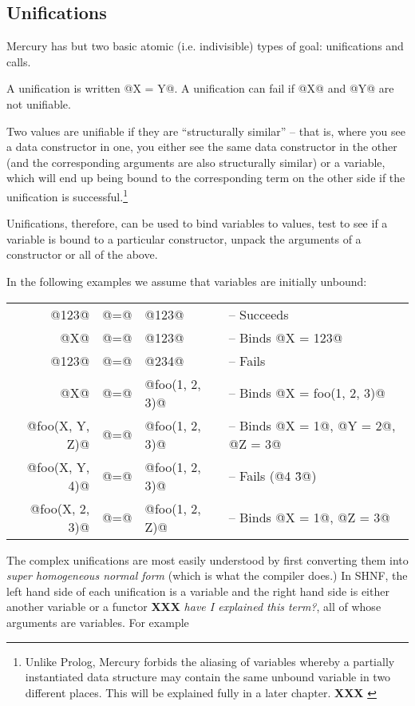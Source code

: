 \documentclass[a4paper,11pt,notitlepage,onecolumn]{article}
\newcommand{\XXX}[1]%
{{\small\textbf{XXX} \emph{#1}}}
\begin{document}
\subsection{Unifications}

Mercury has but two basic atomic (i.e. indivisible) types of
goal: unifications and calls.

A unification is written @X = Y@.  A unification can fail if @X@
and @Y@ are not unifiable.

Two values are unifiable if they are ``structurally similar'' --
that is, where you see a data constructor in one, you either
see the same data constructor in the other (and the
corresponding arguments are also structurally similar) or a
variable, which will end up being bound to the corresponding
term on the other side if the unification is successful.\footnote{Unlike Prolog, Mercury forbids the aliasing of
variables whereby a partially instantiated data structure
may contain the same unbound variable in two different places.
This will be explained fully in a later chapter.  \XXX{}}

Unifications, therefore, can be used to bind variables to
values, test to see if a variable is bound to a particular
constructor, unpack the arguments of a constructor or all of
the above.

In the following examples we assume that variables are
initially unbound:

\begin{tabular}{rcll}
         @123@ & @=@ & @123@ &
                -- Succeeds \\
           @X@ & @=@ & @123@ &
                -- Binds @X = 123@ \\
         @123@ & @=@ & @234@ &
                -- Fails \\
           @X@ & @=@ & @foo(1, 2, 3)@ &
                -- Binds @X = foo(1, 2, 3)@ \\
@foo(X, Y, Z)@ & @=@ & @foo(1, 2, 3)@ &
                -- Binds @X = 1@, @Y = 2@, @Z = 3@ \\
@foo(X, Y, 4)@ & @=@ & @foo(1, 2, 3)@ &
                -- Fails (@4 \= 3@) \\
@foo(X, 2, 3)@ & @=@ & @foo(1, 2, Z)@ &
                -- Binds @X = 1@, @Z = 3@ \\
\end{tabular}

The complex unifications are most easily understood by first
converting them into \emph{super homogeneous normal form} (which is
what the compiler does.)  In SHNF, the left hand side of each
unification is a variable and the right hand side is either
another variable or a functor \XXX{have I explained this term?}, all of
whose arguments are variables.  For example
\end{document}
